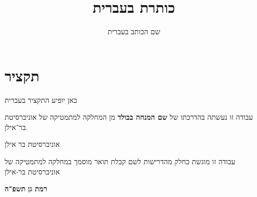 \documentclass[12pt]{article}
\title{כותרת בעברית}
\author{שם הכותב בעברית}
\begin{document}
\section*{תקציר}
	כאן יופיע התקציר בעברית
	
\newpage
\vspace*{\fill}
עבודה זו נעשתה בהדרכתו של
{\bf 
שם המנחה בבולד
}
מן המחלקה למתמטיקה של אוניברסיטת בר־אילן.
\vspace*{\fill}
\begin{titlepage}
\makeatletter
\begin{center}
אוניברסיטת בר אילן\\
	\vspace*{3cm}
	\textbf{\Large \@title}
	\vspace{2cm}
	
	\vspace{2.5cm}
	
	\textbf{\@author}
	
	\vspace{1cm}
	עבודה זו מוגשת כחלק מהדרישות לשם קבלת תואר מוסמך במחלקה למתמטיקה של אוניברסיטת בר-אילן
		
	\vspace*{\fill}
	\textbf{רמת גן}
	\hfill
	\textbf{תשפ"ה}
	
\end{center}
\makeatother
\end{titlepage}
\end{document}

